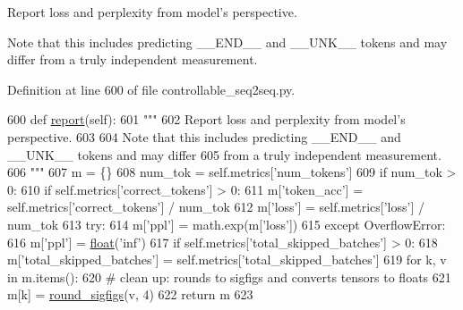 \begin{DoxyVerb}Report loss and perplexity from model's perspective.

Note that this includes predicting __END__ and __UNK__ tokens and may differ
from a truly independent measurement.
\end{DoxyVerb}
 

Definition at line 600 of file controllable\+\_\+seq2seq.\+py.


\begin{DoxyCode}
600     \textcolor{keyword}{def }\hyperlink{namespaceprojects_1_1convai2_1_1eval__f1_a01a47b9c08dad189837a51f085defc45}{report}(self):
601         \textcolor{stringliteral}{"""}
602 \textcolor{stringliteral}{        Report loss and perplexity from model's perspective.}
603 \textcolor{stringliteral}{}
604 \textcolor{stringliteral}{        Note that this includes predicting \_\_END\_\_ and \_\_UNK\_\_ tokens and may differ}
605 \textcolor{stringliteral}{        from a truly independent measurement.}
606 \textcolor{stringliteral}{        """}
607         m = \{\}
608         num\_tok = self.metrics[\textcolor{stringliteral}{'num\_tokens'}]
609         \textcolor{keywordflow}{if} num\_tok > 0:
610             \textcolor{keywordflow}{if} self.metrics[\textcolor{stringliteral}{'correct\_tokens'}] > 0:
611                 m[\textcolor{stringliteral}{'token\_acc'}] = self.metrics[\textcolor{stringliteral}{'correct\_tokens'}] / num\_tok
612             m[\textcolor{stringliteral}{'loss'}] = self.metrics[\textcolor{stringliteral}{'loss'}] / num\_tok
613             \textcolor{keywordflow}{try}:
614                 m[\textcolor{stringliteral}{'ppl'}] = math.exp(m[\textcolor{stringliteral}{'loss'}])
615             \textcolor{keywordflow}{except} OverflowError:
616                 m[\textcolor{stringliteral}{'ppl'}] = \hyperlink{namespaceprojects_1_1controllable__dialogue_1_1make__control__dataset_aa2b7207688c641dbc094ab44eca27113}{float}(\textcolor{stringliteral}{'inf'})
617         \textcolor{keywordflow}{if} self.metrics[\textcolor{stringliteral}{'total\_skipped\_batches'}] > 0:
618             m[\textcolor{stringliteral}{'total\_skipped\_batches'}] = self.metrics[\textcolor{stringliteral}{'total\_skipped\_batches'}]
619         \textcolor{keywordflow}{for} k, v \textcolor{keywordflow}{in} m.items():
620             \textcolor{comment}{# clean up: rounds to sigfigs and converts tensors to floats}
621             m[k] = \hyperlink{namespaceparlai_1_1agents_1_1legacy__agents_1_1seq2seq_1_1utils__v0_af377ec61bfc0423461e7b409ffc883b9}{round\_sigfigs}(v, 4)
622         \textcolor{keywordflow}{return} m
623 
\end{DoxyCode}
